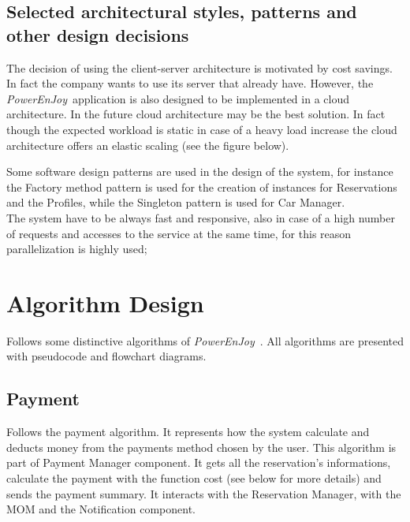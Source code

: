 \documentclass{article}
\newcommand{\pej}{\mbox{\normalfont\itshape PowerEnJoy }}
\begin{document}
		\subsection{Selected architectural styles, patterns and other design decisions}
		The decision of using the client-server architecture is motivated by cost savings. In fact the company wants to use its server that already have. However, the \pej application is also designed to be implemented in a cloud architecture. In the future cloud architecture may be the best solution. In fact though the expected workload is static in case of a heavy load increase the cloud architecture offers an elastic scaling  (see the figure below).\\
		\begin{minipage}{\linewidth}
			\vspace{5mm}
			\vspace{5mm}
		\end{minipage}
		Some software design patterns are used in the design of the system, for instance the Factory method pattern is used for the creation of instances for Reservations and the Profiles, while the Singleton pattern is used for Car Manager.\\
		The system have to be always fast and responsive, also in case of a high number of requests and accesses to the service at the same time, for this reason parallelization is highly used;
		\pagebreak
		
	\section{Algorithm Design}
	Follows some distinctive algorithms of \pej. All algorithms are presented with pseudocode and
	flowchart diagrams.
		\subsection{Payment} \label{sec:payment}
		Follows the payment algorithm. It represents how the system calculate and deducts money from the payments method chosen by the user. This algorithm is part of Payment Manager component. It gets all the reservation's informations, calculate the payment with the function cost (see below for more details) and sends the payment summary. It interacts with the Reservation Manager, with the MOM and the Notification component.
		
\end{document}
